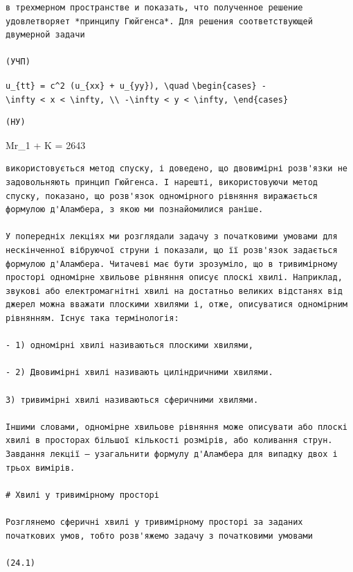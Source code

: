 \documentclass[
  ukrainian,
]{article}
\begin{document}
\begin{verbatim}
в трехмерном пространстве и показать, что полученное решение удовлетворяет *принципу Гюйгенса*. Для решения соответствующей двумерной задачи

(УЧП)
\end{verbatim}

\texttt{u\_\{tt\}\ =\ c\^{}2\ (u\_\{xx\}\ +\ u\_\{yy\}),\ \textbackslash{}quad}
\texttt{\textbackslash{}begin\{cases\}\ -\textbackslash{}infty\ \textless{}\ x\ \textless{}\ \textbackslash{}infty,\ \textbackslash{}\textbackslash{}\ -\textbackslash{}infty\ \textless{}\ y\ \textless{}\ \textbackslash{}infty,\ \textbackslash{}end\{cases\}}

\begin{verbatim}
(НУ)
\end{verbatim}

Mr\_1 + K = 2643

\begin{verbatim}
використовується метод спуску, і доведено, що двовимірні розв'язки не задовольняють принцип Гюйгенса. І нарешті, використовуючи метод спуску, показано, що розв'язок одномірного рівняння виражається формулою д'Аламбера, з якою ми познайомилися раніше.

У попередніх лекціях ми розглядали задачу з початковими умовами для нескінченної вібруючої струни і показали, що її розв'язок задається формулою д'Аламбера. Читачеві має бути зрозуміло, що в тривимірному просторі одномірне хвильове рівняння описує плоскі хвилі. Наприклад, звукові або електромагнітні хвилі на достатньо великих відстанях від джерел можна вважати плоскими хвилями і, отже, описуватися одномірним рівнянням. Існує така термінологія:

- 1) одномірні хвилі називаються плоскими хвилями,

- 2) Двовимірні хвилі називають циліндричними хвилями.

3) тривимірні хвилі називаються сферичними хвилями.

Іншими словами, одномірне хвильове рівняння може описувати або плоскі хвилі в просторах більшої кількості розмірів, або коливання струн. Завдання лекції — узагальнити формулу д'Аламбера для випадку двох і трьох вимірів.

# Хвилі у тривимірному просторі

Розглянемо сферичні хвилі у тривимірному просторі за заданих початкових умов, тобто розв'яжемо задачу з початковими умовами

(24.1)
\end{verbatim}
\end{document}

